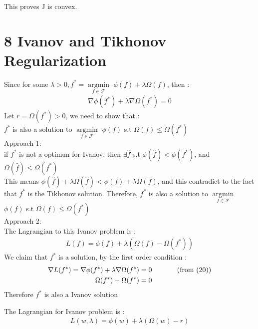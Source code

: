 \documentclass{article}
\newenvironment{problem}[2][$\bullet$]{\begin{trivlist}\large
		\item[\hskip \labelsep {\bfseries #1}\hskip \labelsep {\bfseries #2.}]}  {\end{trivlist}}
\newenvironment{sub}[2][$-$]{\begin{trivlist}
		\item[\hskip \labelsep {\bfseries #1}\hskip \labelsep {\bfseries #2.}]}  {\end{trivlist}}
\begin{document}
This proves J is convex. 

\section{8 Ivanov and Tikhonov Regularization}

\begin{problem}{8.1 Tikhnov optimal implies Ivanov optimal}
\end{problem}
\begin{sub}{8.1.1}
\end{sub}
Since for some $\lambda > 0, f^*  = \underset{f \in \mathcal{F}}{\operatorname{argmin}}$ $ \phi(f) +\lambda \Omega(f)$, then :
\begin{align}
\nabla \phi(f^*) + \lambda \nabla\Omega(f^*) =0
\end{align}
Let $r = \Omega(f^*) > 0$, we need to show that :\\
$f^*$ is also a solution to $\underset{f \in \mathcal{F}}{\operatorname{argmin}}$ $\phi(f)$ s.t $\Omega(f) \leq \Omega(f^*)$\\


Approach 1:\\
if $f^*$ is not a optimun for Ivanov, then $\exists \hat{f}$ s.t $\phi(\hat{f}) < \phi(f^*)$, and $ \Omega(\hat{f}) \leq \Omega(f^*)$\\
This means $\phi(\hat{f}) + \lambda \Omega(\hat{f}) < \phi(f) + \lambda \Omega(f) $, and this contradict to the fact that $f^*$ is the Tikhonov solution. Therefore, $f^*$ is also a solution to $\underset{f \in \mathcal{F}}{\operatorname{argmin}}$ $\phi(f)$ s.t $\Omega(f) \leq \Omega(f^*)$\\

Approach 2:\\
The Lagrangian to this Ivanov problem is  :
\begin{align}
L(f) = \phi(f) + \lambda(\Omega(f) - \Omega(f^*))
\end{align}
We claim that $f^*$ is a solution, by the first order condition :
\begin{align}
\nabla L(f^*) = \nabla \phi(f^*) + \lambda \nabla\Omega(f^*) &= 0\hspace{0.5in } \text{(from (20))}\\
\Omega(f^*) - \Omega(f^*) &= 0
\end{align}
Therefore $f^*$ is also a Ivanov solution

\begin{problem}{8.2 Ivanov optimal implies Tikhonov optimal }
\end{problem}
\begin{sub}{8.2.1}
\end{sub}
The Lagrangian for Ivanov problem is :
\begin{align}
L(w,\lambda) = \phi(w) + \lambda(\Omega(w) - r)
\end{align}
\end{document}
